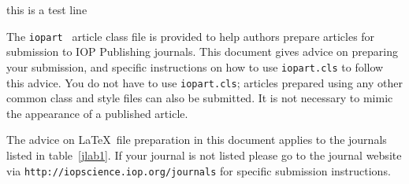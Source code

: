 \documentclass[12pt]{iopart}
\begin{document}
this is a test line\cite{ex2}

The \verb"iopart" \LaTeXe\ article class file is provided to help authors prepare articles for submission to IOP Publishing journals.
  This document gives advice on preparing your submission, and specific instructions on how to use \verb"iopart.cls" to follow this advice.  You
  do not have to use \verb"iopart.cls"; articles prepared using any other common class and style files can also be submitted.
    It is not necessary to mimic the appearance of a published article.

The advice
on \LaTeX\ file preparation in this document applies to
the journals listed in table~\ref{jlab1}.  If your journal is not listed please go to the journal website via \verb"http://iopscience.iop.org/journals" for specific
submission instructions.
\end{document}
